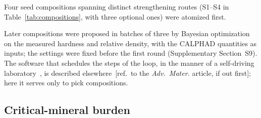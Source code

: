 \documentclass[preprint,12pt]{elsarticle}
\newcommand{\note}[1]{}
\newcommand{\note}[1]{\textcolor{blue!70!black}{\textsf{\footnotesize [Note: #1]}}}
\newcommand{\placeholder}[1]{\textcolor{red!75!black}{[#1]}}
\newcommand{\Scal}{Scalmalloy\xspace}
\begin{document}
Four seed compositions spanning distinct strengthening routes (S1--S4 in Table~\ref{tab:compositions}, with three optional ones) were atomized first.
\note{The \#275 plan proposes S1 Al--4.8Mn--0.9Cr--1.1Zr--1.2Mg, S2 Al--1.9Fe--1.0Mg--1.0Zr, S3 Al--3.5Si--2.5Mg and S4 Al--6Mg--2.5Si--0.7Ti, chosen from the literature, not from the screen. If they stay, say so plainly here: they are literature anchors, and the screen ranks what follows. With the bought baselines, ../preregistration.md proposes dropping S1 (its burden is above \Scal's at every allowed reliance, \PSonelo{} to \PSonehi~wt\%, and Al-HS1 now anchors that family) and making O1 the Al5X1 twin, Al--3.35Mg--0.55Mn--1.2Zr from dosed charges.}
Later compositions were proposed in batches of three by Bayesian optimization~\cite{balandat2020} on the measured hardness and relative density, with the CALPHAD quantities as inputs; the settings were fixed before the first round (Supplementary Section~S9). The software that schedules the steps of the loop, in the manner of a self-driving laboratory~\cite{tom2024}, is described elsewhere~\placeholder{ref.\ to the \textit{Adv.\ Mater.} article, if out first}; here it serves only to pick compositions.
\note{Keep the optimizer to this paragraph. The cost-aware network optimizer and any acceleration claim belong to the \textit{Adv.\ Mater.} article (\#120); see ../outline.md.}

\begin{table}[tbp]
  \centering\footnotesize
  \caption{Nominal compositions (wt\%, balance Al) and critical-mineral burden. $B_\mathrm{NIR}$: import-weighted burden (Eq.~\ref{eq:burden}); $B_\mathrm{cost}$: raw-material cost of the alloying additions. \placeholder{Measured compositions (EDS in-house, ICP-OES outside) are added for the campaign alloys.}}
  \label{tab:compositions}
  \resizebox{\textwidth}{!}{}
\end{table}

\subsection{Critical-mineral burden}
\label{sec:burden}
\end{document}
